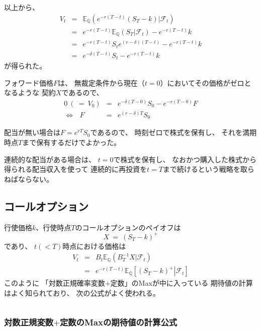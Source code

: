 \documentclass[uplatex,a4j,12pt,dvipdfmx]{jsarticle}
\begin{document}
以上から、
%
%
\begin{eqnarray*}
	V_{t}
	&=&
	\mathbb{E}_{\mathbb{Q}} ( e^{-r(T-t)} (S_{T} - k) | \mathcal{F}_{t} )
	\\ &=&
	e^{-r(T-t)} \mathbb{E}_{\mathbb{Q}} ( S_{T}  | \mathcal{F}_{t} ) - e^{-r(T-t)} k
	\\ &=&
	e^{-r(T-t)} S_{t} e^{(r-\delta)(T-t)} - e^{-r(T-t)} k
	\\ &=&
	e^{-\delta(T-t)}S_{t} - e^{-r(T-t)} k
\end{eqnarray*}
%
%
が得られた。

フォワード価格$F$は、
無裁定条件から現在（$t=0$）においてその価格がゼロとなるような
契約$X$であるので、
%
%
\begin{eqnarray*}
	0\
	( \ = \
	V_{0})
	&=&
	e^{- \delta ( T - 0 ) } S_{0} - e^{-r(T-0)} F
	\\
	\Longleftrightarrow \ \ \
	F &=&
	e^{(r - \delta) T } S_{0}
\end{eqnarray*}
%
%

配当が無い場合は$F=e^{rT}S_{0}$であるので、
時刻ゼロで株式を保有し、
それを満期時点$T$まで保有するだけでよかった。

連続的な配当がある場合は、
$t=0$で株式を保有し、
なおかつ購入した株式から得られる配当収入を使って
連続的に再投資を$t=T$まで続けるという戦略を取らねばならない。

\subsection{コールオプション}

行使価格$k$、行使時点$T$のコールオプションのペイオフは
$$
	X
	\ = \
	(S_{T} - k)^{+}
$$
であり、
$t(<T)$時点における価格は
%
%
\begin{eqnarray*}
	V_{t}
	&=&
	B_{t}
	\mathbb{E}_{\mathbb{Q}} ( B^{-1}_{T} X | \mathcal{F}_{t} )
	\\ &=&
	e^{-r(T-t)}
	\mathbb{E}_{\mathbb{Q}} \left[ \left. \left( S_{T} - k \right)^{+} \right| \mathcal{F}_{t} \right]
\end{eqnarray*}
%
%
このように
「対数正規確率変数$+$定数」のMaxが中に入っている
期待値の計算はよく知られており、
次の公式がよく使われる。

${}$

\subsubsection*{対数正規変数$+$定数のMaxの期待値の計算公式}
\end{document}
